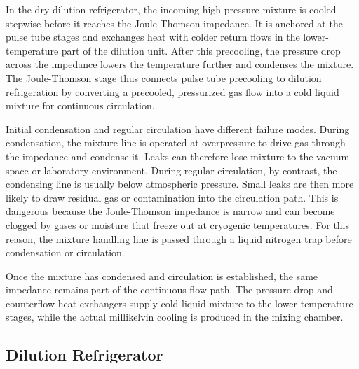         In the dry dilution refrigerator, the incoming high-pressure mixture is cooled stepwise before it reaches the Joule-Thomson impedance. It is anchored at the pulse tube stages and exchanges heat with colder return flows in the lower-temperature part of the dilution unit. After this precooling, the pressure drop across the impedance lowers the temperature further and condenses the mixture. The Joule-Thomson stage thus connects pulse tube precooling to dilution refrigeration by converting a precooled, pressurized gas flow into a cold liquid mixture for continuous circulation.

        Initial condensation and regular circulation have different failure modes. During condensation, the mixture line is operated at overpressure to drive gas through the impedance and condense it. Leaks can therefore lose mixture to the vacuum space or laboratory environment. During regular circulation, by contrast, the condensing line is usually below atmospheric pressure. Small leaks are then more likely to draw residual gas or contamination into the circulation path. This is dangerous because the Joule-Thomson impedance is narrow and can become clogged by gases or moisture that freeze out at cryogenic temperatures. For this reason, the mixture handling line is passed through a liquid nitrogen trap before condensation or circulation.

        Once the mixture has condensed and circulation is established, the same impedance remains part of the continuous flow path. The pressure drop and counterflow heat exchangers supply cold liquid mixture to the lower-temperature stages, while the actual millikelvin cooling is produced in the mixing chamber.

    \subsection*{Dilution Refrigerator}

